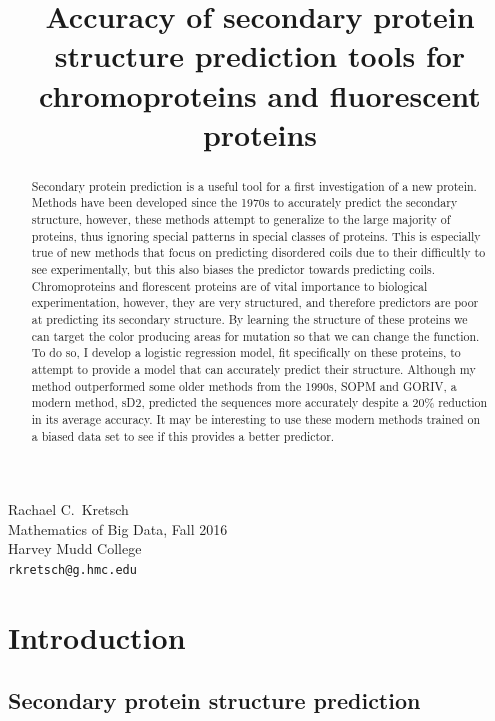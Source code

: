 \documentclass{article}
\title{Accuracy of secondary protein structure prediction tools for chromoproteins and fluorescent proteins}
\begin{document}

 Rachael C.~Kretsch \\
 Mathematics of Big Data, Fall 2016\\
 Harvey Mudd College\\
 \texttt{rkretsch@g.hmc.edu} \\

\maketitle

\begin{abstract}
   Secondary protein prediction is a useful tool for a first investigation of a new protein. Methods have been developed since the 1970s to accurately predict the secondary structure, however, these methods attempt to generalize to the large majority of proteins, thus ignoring special patterns in special classes of proteins. This is especially true of new methods that focus on predicting disordered coils due to their difficultly to see experimentally, but this also biases the predictor towards predicting coils. Chromoproteins and florescent proteins are of vital importance to biological experimentation, however, they are very structured, and therefore predictors are poor at predicting its secondary structure. By learning the structure of these proteins we can target the color producing areas for mutation so that we can change the function. To do so, I develop a logistic regression model, fit specifically on these proteins, to attempt to provide a model that can accurately predict their structure. Although my method outperformed some older methods from the 1990s, SOPM and GORIV, a modern method, sD2, predicted the sequences more accurately despite a 20\% reduction in its average accuracy. It may be interesting to use these modern methods trained on a biased data set to see if this provides a better predictor.
\end{abstract}

\section{Introduction}

\subsection{Secondary protein structure prediction}
\end{document}
